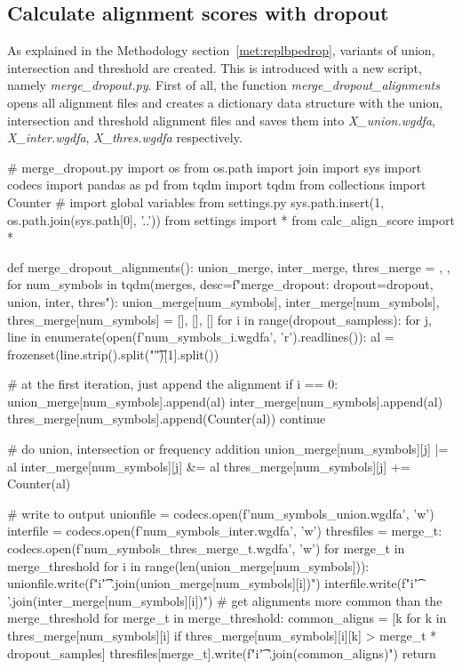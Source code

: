 \subsection{Calculate alignment scores with dropout}

As explained in the Methodology section~\ref{met:replbpedrop}, variants of union, intersection and threshold are created. This is introduced with a new script, namely \emph{merge\_dropout.py}. First of all, the function \emph{merge\_dropout\_alignments} opens all alignment files and creates a dictionary data structure with the union, intersection and threshold alignment files and saves them into \emph{X\_union.wgdfa}, \emph{X\_inter.wgdfa}, \emph{X\_thres.wgdfa} respectively.

\begin{python}
# merge_dropout.py
import os
from os.path import join
import sys
import codecs
import pandas as pd
from tqdm import tqdm
from collections import Counter
# import global variables from settings.py
sys.path.insert(1, os.path.join(sys.path[0], '..'))
from settings import *
from calc_align_score import *

def merge_dropout_alignments():
  union_merge, inter_merge, thres_merge = {}, {}, {}
  for num_symbols in tqdm(merges, desc=f"merge_dropout: dropout={dropout}, union, inter, thres"):
    union_merge[num_symbols], inter_merge[num_symbols], thres_merge[num_symbols] = [], [], []
    for i in range(dropout_sampless):
      for j, line in enumerate(open(f'{num_symbols}_{i}.wgdfa', 'r').readlines()):
        al = frozenset(line.strip().split("\t")[1].split())

        # at the first iteration, just append the alignment
        if i == 0:
          union_merge[num_symbols].append(al)
          inter_merge[num_symbols].append(al)
          thres_merge[num_symbols].append(Counter(al))
          continue
        
        # do union, intersection or frequency addition
        union_merge[num_symbols][j] |= al
        inter_merge[num_symbols][j] &= al
        thres_merge[num_symbols][j] += Counter(al)

    # write to output
    unionfile = codecs.open(f'{num_symbols}_union.wgdfa', 'w')
    interfile = codecs.open(f'{num_symbols}_inter.wgdfa', 'w')
    thresfiles = {merge_t: codecs.open(f'{num_symbols}_thres_{merge_t}.wgdfa', 'w') for merge_t in merge_threshold}
    for i in range(len(union_merge[num_symbols])):
      unionfile.write(f"{i}\t{' '.join(union_merge[num_symbols][i])}\n")
      interfile.write(f"{i}\t{' '.join(inter_merge[num_symbols][i])}\n")
      # get alignments more common than the merge_threshold %
      for merge_t in merge_threshold:
        common_aligns = [k for k in thres_merge[num_symbols][i] 
                        if thres_merge[num_symbols][i][k] > merge_t * dropout_samples]
        thresfiles[merge_t].write(f"{i}\t{' '.join(common_aligns)}\n")
  return
\end{python}

